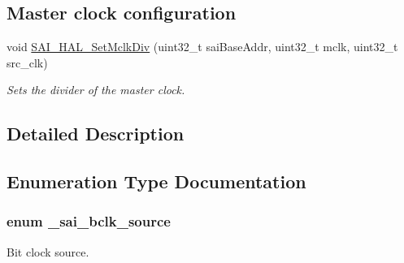 \subsection*{Master clock configuration}
\begin{DoxyCompactItemize}
\item 
void \hyperlink{group__sai__hal_gaca1f38cdd4e0ba3bd95ba76729850428}{S\+A\+I\+\_\+\+H\+A\+L\+\_\+\+Set\+Mclk\+Div} (uint32\+\_\+t sai\+Base\+Addr, uint32\+\_\+t mclk, uint32\+\_\+t src\+\_\+clk)
\begin{DoxyCompactList}\small\item\em Sets the divider of the master clock. \end{DoxyCompactList}\end{DoxyCompactItemize}


\subsection{Detailed Description}


\subsection{Enumeration Type Documentation}
\subsubsection[{\texorpdfstring{\+\_\+sai\+\_\+bclk\+\_\+source}{_sai_bclk_source}}]{\setlength{\rightskip}{0pt plus 5cm}enum {\bf \+\_\+sai\+\_\+bclk\+\_\+source}}\hypertarget{group__sai__hal_gae133d8e667ce98cdb9f7b3e4d60679ff}{}\label{group__sai__hal_gae133d8e667ce98cdb9f7b3e4d60679ff}


Bit clock source. 

